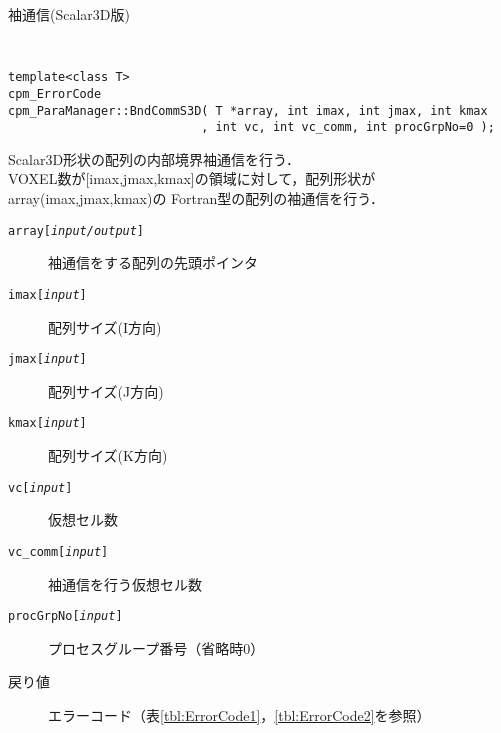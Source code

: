 \begin{spacing}{0.8}
\begin{itembox}[l]{袖通信(Scalar3D版)}
{\tt
\begin{verbatim}
template<class T>
cpm_ErrorCode
cpm_ParaManager::BndCommS3D( T *array, int imax, int jmax, int kmax
                           , int vc, int vc_comm, int procGrpNo=0 );
\end{verbatim}
}
Scalar3D形状の配列の内部境界袖通信を行う．\\
VOXEL数が[imax,jmax,kmax]の領域に対して，配列形状がarray(imax,jmax,kmax)の
Fortran型の配列の袖通信を行う．
\begin{description}
\item[{\tt array[{\it input/output}]}] 袖通信をする配列の先頭ポインタ
\item[{\tt imax[{\it input}]}] 配列サイズ(I方向)
\item[{\tt jmax[{\it input}]}] 配列サイズ(J方向)
\item[{\tt kmax[{\it input}]}] 配列サイズ(K方向)
\item[{\tt vc[{\it input}]}] 仮想セル数
\item[{\tt vc\_comm[{\it input}]}] 袖通信を行う仮想セル数
\item[{\tt procGrpNo[{\it input}]}] プロセスグループ番号（省略時0）
\\
\item[戻り値] エラーコード（表\ref{tbl:ErrorCode1}，\ref{tbl:ErrorCode2}を参照）
\end{description}
\end{itembox}\\
\end{spacing}

